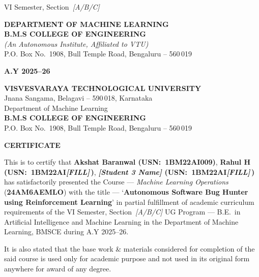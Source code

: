 \documentclass[12pt,a4paper]{report}
\newcommand{\btitle}{Autonomous Software Bug Hunter using Reinforcement Learning}
\newcommand{\coursename}{Machine Learning Operations}
\newcommand{\coursecode}{24AM6AEMLO}
\newcommand{\deptname}{Machine Learning}
\newcommand{\collegename}{B.M.S COLLEGE OF ENGINEERING}
\newcommand{\uniline}{(An Autonomous Institute, Affiliated to VTU)}
\newcommand{\collegeaddr}{P.O. Box No.~1908, Bull Temple Road, Bengaluru -- 560\,019}
\newcommand{\ay}{A.Y 2025--26}
\newcommand{\studentA}{Akshat Baranwal \quad (USN:~1BM22AI009)}
\newcommand{\studentB}{Rahul H          \quad (USN:~1BM22AI\textit{[FILL]}\,)}
\newcommand{\studentC}{\textit{[Student 3 Name]}  \quad (USN:~1BM22AI\textit{[FILL]}\,)}
\newcommand{\semSection}{VI Semester, Section~\textit{[A/B/C]}}
\begin{document}
\begin{titlepage}
\begin{center}
{\fontsize{12}{16}\selectfont \semSection}

\vfill

\textbf{\fontsize{16}{20}\selectfont DEPARTMENT OF \MakeUppercase{\deptname}}\\[6pt]
\textbf{\fontsize{18}{22}\selectfont \collegename}\\[4pt]
{\fontsize{10}{14}\selectfont\itshape \uniline}\\[2pt]
{\fontsize{12}{16}\selectfont \collegeaddr}

\vspace{0.6cm}

\textbf{\fontsize{14}{18}\selectfont \ay}

\end{center}
\end{titlepage}

\newpage
\thispagestyle{plain}
\setcounter{page}{1}

\begin{center}
\textbf{\fontsize{16}{20}\selectfont VISVESVARAYA TECHNOLOGICAL UNIVERSITY}\\[2pt]
{\fontsize{12}{16}\selectfont Jnana Sangama, Belagavi -- 590\,018, Karnataka}\\[8pt]
{\fontsize{14}{18}\selectfont Department of \deptname}\\[2pt]
\textbf{\fontsize{14}{18}\selectfont \collegename}\\[4pt]
{\fontsize{12}{16}\selectfont \collegeaddr}

\vspace{1.0cm}

\textbf{\fontsize{16}{20}\selectfont CERTIFICATE}
\end{center}

\vspace{0.6cm}
\setlength{\parindent}{0pt}

This is to certify that \textbf{\studentA}, \textbf{\studentB},
\textbf{\studentC} has satisfactorily presented the Course ---
\textit{\coursename} (\textbf{\coursecode}) with the title ---
`\textbf{\btitle}' in partial fulfillment of academic curriculum
requirements of the \semSection{} UG Program --- B.E.\ in Artificial
Intelligence and Machine Learning in the Department of \deptname, BMSCE
during \ay.

It is also stated that the base work \& materials considered for
completion of the said course is used only for academic purpose and not
used in its original form anywhere for award of any degree.
\end{document}
